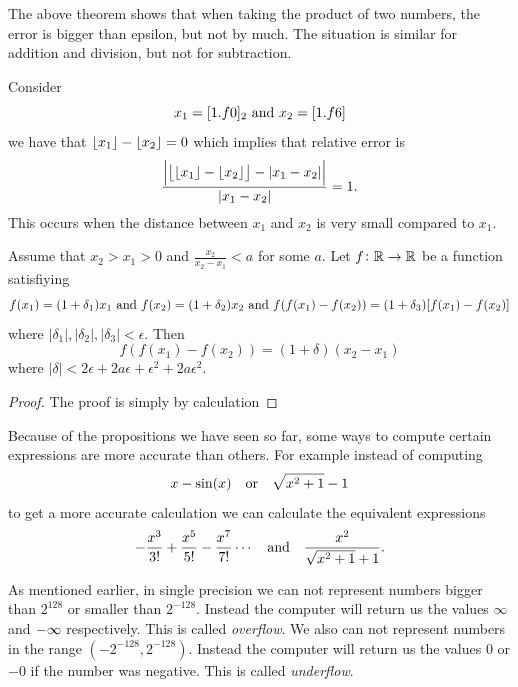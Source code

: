 \documentclass[11pt,a4paper]{article}
\begin{document}
The above theorem shows that when taking the product of two numbers,
the error is bigger than epsilon, but not by much.
The situation is similar for addition and division,
but not for subtraction.

Consider
\[
  x_1 = [1.f0]_2 \text{ and } x_2 = [1.f6]
\]
we have that $\left\lfloor x_1 \right\rfloor - \left\lfloor x_2 \right\rfloor = 0$ which implies that
relative error is
\[
  \frac{\left\lvert\left\lfloor \left\lfloor x_1 \right\rfloor - \left\lfloor x_2 \right\rfloor \right\rfloor - |x_1 - x_2|\right\rvert}{|x_1 - x_2|} = 1.
\]
This occurs when the distance between $x_1$ and $x_2$ is very small compared
to $x_1$.

\begin{proposition}
  Assume that $x_2 > x_1 > 0$ and $\frac{x_2}{x_2 - x_1} < a$ for some $a$.
  Let $f \colon \mathbb{R} \to \mathbb{R}$ be a function satisfiying
  \[
    f(x_1) = (1 + \delta_1) x_1 \text{ and }
    f(x_2) = (1 + \delta_2) x_2 \text{ and }
    f(f(x_1) - f(x_2)) = (1 + \delta_3)[f(x_1) - f(x_2)]
  \]
  where $|\delta_1|, |\delta_2|, |\delta_3| < \epsilon$.
  Then
  \[
    f(f(x_1) - f(x_2)) = (1 + \delta)(x_2 - x_1)
  \]
  where $|\delta| < 2 \epsilon + 2 a \epsilon + \epsilon^2 + 2 a \epsilon^2$.
\end{proposition}
\begin{proof}
  The proof is simply by calculation
\end{proof}

Because of the propositions we have seen so far, some ways to compute
certain expressions are more accurate than others.
For example instead of computing
\[
  x - \sin(x) \quad \text{or} \quad
  \sqrt{x^2 + 1} - 1
\]
to get a more accurate calculation we can calculate the equivalent
expressions
\[
  - \frac{x^3}{3!} + \frac{x^5}{5!} - \frac{x^7}{7!} \cdots
  \quad \text{and} \quad
  \frac{x^2}{\sqrt{x^2 + 1} + 1}.
\]

As mentioned earlier, in single precision we can not represent numbers bigger
than $2^{128}$ or smaller than $2^{-128}$.
Instead the computer will return us the values $\infty$ and $-\infty$ 
respectively. This is called \emph{overflow}.
We also can not represent numbers in the range $(-2^{-128}, 2^{-128})$.
Instead the computer will return us the values $0$ or $-0$ if the number
was negative. This is called \emph{underflow}.
\end{document}
